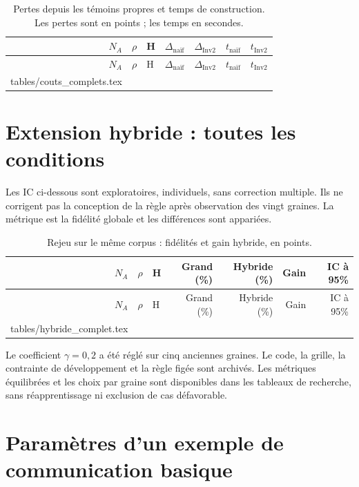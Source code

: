 \documentclass[11pt,a4paper]{article}
\makeatletter
\let\tableinput\@@input
\makeatother
\begin{document}
\clearpage
\begin{center}\small
\begin{longtable}{rrlrrrr}
\caption{Pertes depuis les témoins propres et temps de construction. Les pertes sont en points ; les temps en secondes.}\\
\toprule
$N_A$ & $\rho$ & H & $\Delta_{\text{naïf}}$ & $\Delta_{\mathrm{Inv2}}$ & $t_{\text{naïf}}$ & $t_{\mathrm{Inv2}}$ \\
\midrule\endfirsthead
\toprule $N_A$ & $\rho$ & H & $\Delta_{\text{naïf}}$ & $\Delta_{\mathrm{Inv2}}$ & $t_{\text{naïf}}$ & $t_{\mathrm{Inv2}}$ \\
\midrule\endhead
\tableinput tables/couts_complets.tex
\bottomrule
\end{longtable}
\end{center}

\clearpage
\section{Extension hybride : toutes les conditions}
Les IC ci-dessous sont exploratoires, individuels, sans correction multiple.
Ils ne corrigent pas la conception de la règle après observation des vingt
graines. La métrique est la fidélité globale et les différences sont appariées.

\begin{center}\small
\begin{longtable}{rrlrrrr}
\caption{Rejeu sur le même corpus : fidélités et gain hybride, en points.}\\
\toprule
$N_A$ & $\rho$ & H & Grand (\%) & Hybride (\%) & Gain & IC à 95\% \\
\midrule\endfirsthead
\toprule $N_A$ & $\rho$ & H & Grand (\%) & Hybride (\%) & Gain & IC à 95\% \\
\midrule\endhead
\tableinput tables/hybride_complet.tex
\bottomrule
\end{longtable}
\end{center}

Le coefficient $\gamma=0,2$ a été réglé sur cinq anciennes graines. Le code,
la grille, la contrainte de développement et la règle figée sont archivés.
Les métriques équilibrées et les choix par graine sont disponibles dans les
tableaux de recherche, sans réapprentissage ni exclusion de cas défavorable.

\clearpage
\section{Paramètres d'un exemple de communication basique}
\end{document}
